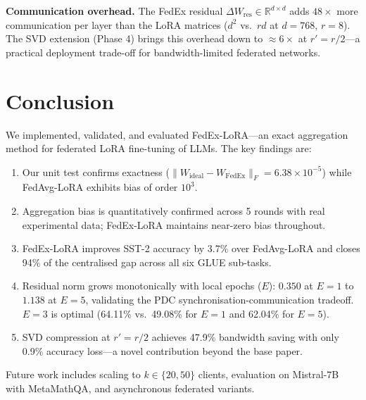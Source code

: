 \documentclass[conference]{IEEEtran}
\begin{document}
\textbf{Communication overhead.}
The FedEx residual $\Delta W_{\mathrm{res}}\in\mathbb{R}^{d\times d}$ adds
$48\times$ more communication per layer than the LoRA matrices ($d^2$ vs.\ $rd$
at $d{=}768$, $r{=}8$). The SVD extension (Phase 4) brings this overhead down
to $\approx6\times$ at $r'{=}r/2$---a practical deployment trade-off for
bandwidth-limited federated networks.

\section{Conclusion}
\label{sec:conclusion}

We implemented, validated, and evaluated FedEx-LoRA---an exact aggregation
method for federated LoRA fine-tuning of LLMs. The key findings are:

\begin{enumerate}
  \item Our unit test confirms exactness ($\|W_{\mathrm{ideal}}-W_{\mathrm{FedEx}}\|_F
        = 6.38\times10^{-5}$) while FedAvg-LoRA exhibits bias of order $10^3$.
  \item Aggregation bias is quantitatively confirmed across 5 rounds with real
        experimental data; FedEx-LoRA maintains near-zero bias throughout.
  \item FedEx-LoRA improves SST-2 accuracy by 3.7\% over FedAvg-LoRA and
        closes 94\% of the centralised gap across all six GLUE sub-tasks.
  \item Residual norm grows monotonically with local epochs ($E$):
        $0.350$ at $E{=}1$ to $1.138$ at $E{=}5$, validating the PDC
        synchronisation-communication tradeoff. $E{=}3$ is optimal (64.11\%
        vs.\ 49.08\% for $E{=}1$ and 62.04\% for $E{=}5$).
  \item SVD compression at $r'{=}r/2$ achieves 47.9\% bandwidth saving with
        only 0.9\% accuracy loss---a novel contribution beyond the base paper.
\end{enumerate}

Future work includes scaling to $k\in\{20,50\}$ clients, evaluation on
Mistral-7B with MetaMathQA, and asynchronous federated variants.
\end{document}
